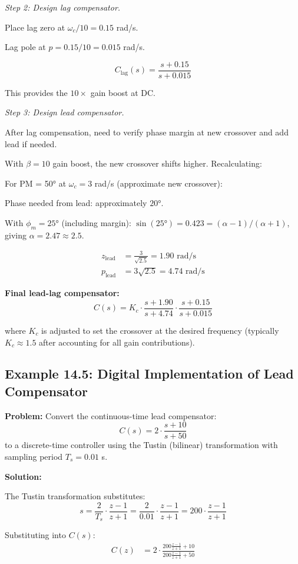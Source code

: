 \textit{Step 2: Design lag compensator.}

Place lag zero at $\omega_c/10 = 0.15$ rad/s.

Lag pole at $p = 0.15/10 = 0.015$ rad/s.

\[
C_{\text{lag}}(s) = \frac{s + 0.15}{s + 0.015}
\]

This provides the $10\times$ gain boost at DC.

\textit{Step 3: Design lead compensator.}

After lag compensation, need to verify phase margin at new crossover and add lead if needed.

With $\beta = 10$ gain boost, the new crossover shifts higher. Recalculating:

For PM = 50° at $\omega_c = 3$ rad/s (approximate new crossover):

Phase needed from lead: approximately $20°$.

With $\phi_m = 25°$ (including margin): $\sin(25°) = 0.423 = (\alpha-1)/(\alpha+1)$, giving $\alpha = 2.47 \approx 2.5$.

\begin{align}
z_{\text{lead}} &= \frac{3}{\sqrt{2.5}} = 1.90 \text{ rad/s} \\
p_{\text{lead}} &= 3\sqrt{2.5} = 4.74 \text{ rad/s}
\end{align}

\textbf{Final lead-lag compensator:}
\[
\boxed{C(s) = K_c \cdot \frac{s + 1.90}{s + 4.74} \cdot \frac{s + 0.15}{s + 0.015}}
\]

where $K_c$ is adjusted to set the crossover at the desired frequency (typically $K_c \approx 1.5$ after accounting for all gain contributions).

\subsection{Example 14.5: Digital Implementation of Lead Compensator}

\textbf{Problem:} Convert the continuous-time lead compensator:
\[
C(s) = 2 \cdot \frac{s + 10}{s + 50}
\]
to a discrete-time controller using the Tustin (bilinear) transformation with sampling period $T_s = 0.01$ s.

\textbf{Solution:}

The Tustin transformation substitutes:
\[
s = \frac{2}{T_s} \cdot \frac{z-1}{z+1} = \frac{2}{0.01} \cdot \frac{z-1}{z+1} = 200 \cdot \frac{z-1}{z+1}
\]

Substituting into $C(s)$:
\begin{align}
C(z) &= 2 \cdot \frac{200\frac{z-1}{z+1} + 10}{200\frac{z-1}{z+1} + 50}
\end{align}

